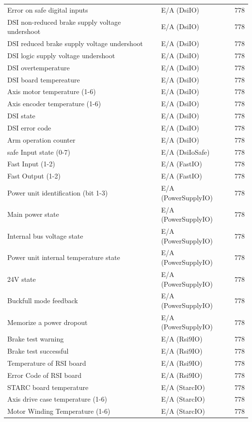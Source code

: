\documentclass[ a4paper,
                oneside,
                toc=bibliography,
                toc=listof
                ]{scrbook}
\begin{document}
\begin{longtable}{|p{6cm}|p{4cm}|p{4cm}|}
		Error on safe digital inputs & E/A (DsiIO) & 778 \\
		DSI non-reduced brake supply voltage undershoot & E/A (DsiIO) & 778 \\
		DSI reduced brake supply voltage undershoot & E/A (DsiIO) & 778 \\
		DSI logic supply voltage undershoot & E/A (DsiIO) & 778 \\
		DSI overtemperature & E/A (DsiIO) & 778 \\
		\hline
		DSI board tempereature & E/A (DsiIO) & 778 \\
		Axis motor temperature (1-6) & E/A (DsiIO) & 778 \\
		Axis encoder temperature (1-6) & E/A (DsiIO) & 778 \\
		DSI state & E/A (DsiIO) & 778 \\
		DSI error code & E/A (DsiIO) & 778 \\
		Arm operation counter & E/A (DsiIO) & 778 \\
		\hline
		safe Input state (0-7) & E/A (DsiIoSafe) & 778 \\
		\hline
		Fast Input (1-2) & E/A (FastIO) & 778 \\
		Fast Output (1-2) & E/A (FastIO) & 778 \\
		\hline
		Power unit identification (bit 1-3) & E/A (PowerSupplyIO) & 778 \\
		Main power state & E/A (PowerSupplyIO) & 778 \\
		Internal bus voltage state & E/A (PowerSupplyIO) & 778 \\
		Power unit internal temperature state & E/A (PowerSupplyIO) & 778 \\
		24V state & E/A (PowerSupplyIO) & 778 \\
		Buckfull mode feedback & E/A (PowerSupplyIO) & 778 \\
		Memorize a power dropout & E/A (PowerSupplyIO) & 778 \\
		\hline
		Brake test warning & E/A (Rsi9IO) & 778 \\
		Brake test successful & E/A (Rsi9IO) & 778 \\
		Temperature of RSI board & E/A (Rsi9IO) & 778 \\
		Error Code of RSI board & E/A (Rsi9IO) & 778 \\
		\hline
		STARC board temperature & E/A (StarcIO) & 778 \\
		Axis drive case temperature (1-6) & E/A (StarcIO) & 778 \\
		Motor Winding Temperature (1-6) & E/A (StarcIO) & 778 \\

\end{longtable}
\end{document}
